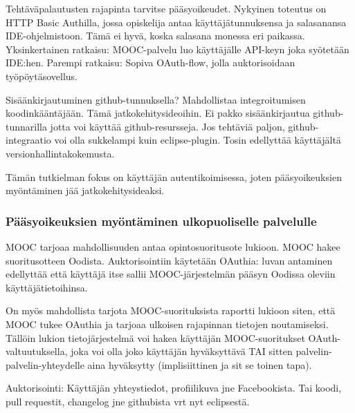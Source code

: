 \documentclass[finnish,gradu]{tktltiki}
\begin{document}
  Tehtäväpalautusten rajapinta tarvitse pääsyoikeudet. Nykyinen toteutus on HTTP Basic Authilla, jossa opiskelija antaa käyttäjätunnuksensa ja salasanansa IDE-ohjelmistoon. Tämä ei hyvä, koska salasana monessa eri paikassa. Yksinkertainen ratkaisu: MOOC-palvelu luo käyttäjälle API-keyn joka syötetään IDE:hen. Parempi ratkaisu: Sopiva OAuth-flow, jolla auktorisoidaan työpöytäsovellus.

  Sisäänkirjautuminen github-tunnuksella? Mahdollistaa integroitumisen koodinkääntäjään. Tämä jatkokehitysideoihin. Ei pakko sisäänkirjautua github-tunnarilla jotta voi käyttää github-resursseja. Jos tehtäviä paljon, github-integraatio voi olla sukkelampi kuin eclipse-plugin. Tosin edellyttää käyttäjältä versionhallintakokemusta.


  Tämän tutkielman fokus on käyttäjän autentikoimisessa, joten pääsyoikeuksien myöntäminen jää jatkokehitysideaksi.



  \subsubsection{Pääsyoikeuksien myöntäminen ulkopuoliselle palvelulle} %
  \label{ssub:jatkokehitysideoita_auktorisointi}
  MOOC tarjoaa mahdollisuuden antaa opintosuoritusote lukioon. MOOC hakee suoritusotteen Oodista. Auktorisointiin käytetään OAuthia: luvan antaminen edellyttää että käyttäjä itse sallii MOOC-järjestelmän pääsyn Oodissa oleviin käyttäjätietoihinsa.

  On myös mahdollista tarjota MOOC-suorituksista raportti lukioon siten, että MOOC tukee OAuthia ja tarjoaa ulkoisen rajapinnan tietojen noutamiseksi. Tällöin lukion tietojärjestelmä voi hakea käyttäjän MOOC-suoritukset OAuth-valtuutuksella, joka voi olla joko käyttäjän hyväksyttävä TAI sitten palvelin-palvelin-yhteydelle aina hyväksytty (implisiittinen ja sit se toinen tapa).

  Auktorisointi: Käyttäjän yhteystiedot, profiilikuva jne Facebookista. Tai koodi, pull requestit, changelog jne githubista vrt nyt eclipsestä.
\end{document}
